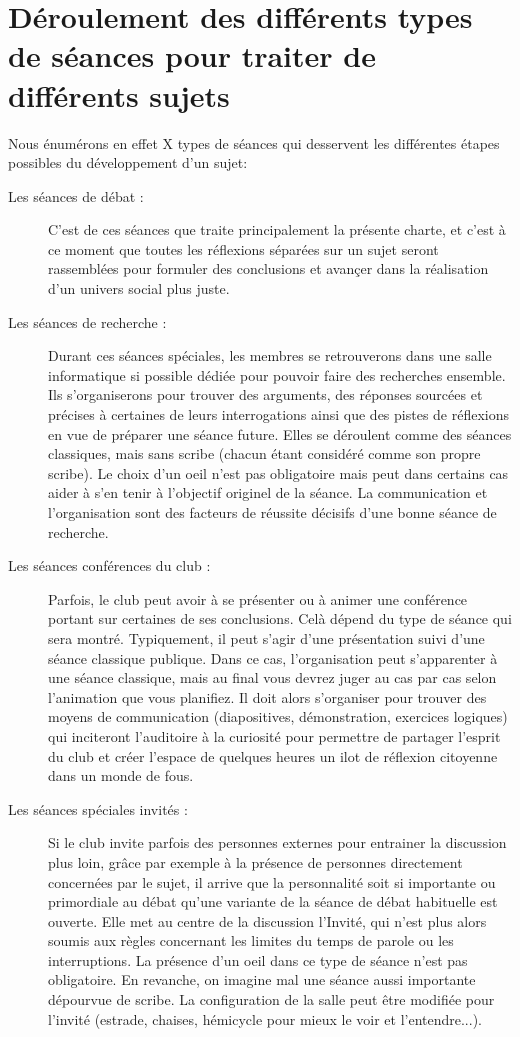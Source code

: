\documentclass[a4paper,12pt]{article}
\begin{document}
\section{Déroulement des différents types de séances pour traiter de différents sujets}
Nous énumérons en effet X types de séances qui desservent les différentes étapes possibles du développement d'un sujet:
\begin{description}
 \item [Les séances de débat :] C'est de ces séances que traite principalement la présente charte, et c'est à ce moment que toutes les réflexions séparées sur un sujet seront rassemblées pour formuler des conclusions et avançer dans la réalisation d'un univers social plus juste.
 \item [Les séances de recherche :] Durant ces séances spéciales, les membres se retrouverons dans une salle informatique si possible dédiée pour pouvoir faire des recherches ensemble. Ils s'organiserons pour trouver des arguments, des réponses sourcées et précises à certaines de leurs interrogations ainsi que des pistes de réflexions en vue de préparer une séance future. Elles se déroulent comme des séances classiques, mais sans scribe (chacun étant considéré comme son propre scribe). Le choix d'un oeil n'est pas obligatoire mais peut dans certains cas aider à s'en tenir à l'objectif originel de la séance. La communication et l'organisation sont des facteurs de réussite décisifs d'une bonne séance de recherche.
 \item [Les séances conférences du club :] Parfois, le club peut avoir à se présenter ou à animer une conférence portant sur certaines de ses conclusions. Celà dépend du type de séance qui sera montré. Typiquement, il peut s'agir d'une présentation suivi d'une séance classique publique. Dans ce cas, l'organisation peut s'apparenter à une séance classique, mais au final vous devrez juger au cas par cas selon l'animation que vous planifiez. Il doit alors s'organiser pour trouver des moyens de communication (diapositives, démonstration, exercices logiques) qui inciteront l'auditoire à la curiosité pour permettre de partager l'esprit du club et créer l'espace de quelques heures un ilot de réflexion citoyenne dans un monde de fous. 
 \item [Les séances spéciales invités :] Si le club invite parfois des personnes externes pour entrainer la discussion plus loin, grâce par exemple à la présence de personnes directement concernées par le sujet, il arrive que la personnalité soit si importante ou primordiale au débat qu'une variante de la séance de débat habituelle est ouverte. Elle met au centre de la discussion l'Invité, qui n'est plus alors soumis aux règles concernant les limites du temps de parole ou les interruptions. La présence d'un oeil dans ce type de séance n'est pas obligatoire. En revanche, on imagine mal une séance aussi importante dépourvue de scribe. La configuration de la salle peut être modifiée pour l'invité (estrade, chaises, hémicycle pour mieux le voir et l'entendre...).
\end{description}
\end{document}
